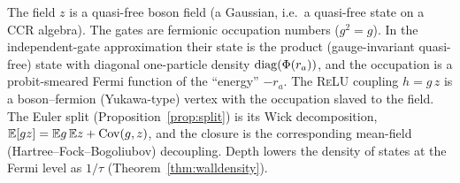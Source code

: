 \begin{remark}
The field $z$ is a quasi-free boson field (a Gaussian, i.e.\ a quasi-free state on a CCR algebra). The gates are fermionic occupation
numbers ($g^2=g$). In the independent-gate approximation their state is the product (gauge-invariant quasi-free) state with diagonal
one-particle density $\operatorname{diag}(\Phi(r_a))$, and the occupation is a probit-smeared Fermi function of the ``energy'' $-r_a$. The
\textsc{ReLU} coupling $h=g\,z$ is a boson--fermion (Yukawa-type) vertex with the occupation slaved to the field. The Euler split
(Proposition~\ref{prop:split}) is its Wick decomposition, $\mathbb E[gz]=\mathbb E g\,\mathbb E z+\operatorname{Cov}(g,z)$, and the closure is the corresponding
mean-field (Hartree--Fock--Bogoliubov) decoupling. Depth lowers the density of states at the Fermi level as $1/\tau$
(Theorem~\ref{thm:walldensity}).
\end{remark}

